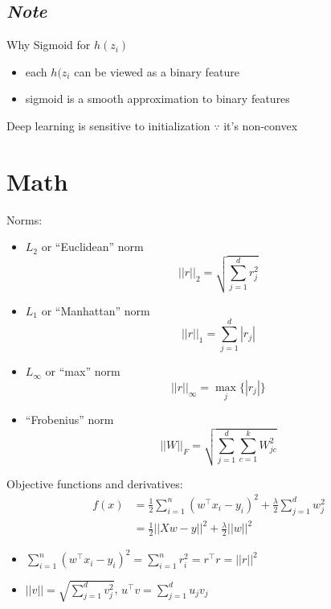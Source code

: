 \documentclass[10pt,landscape,a4paper]{article}
\begin{document}
\begin{multicols*}{5}
\subsection{\emph{Note}}
Why Sigmoid for \(h(z_i)\)
\begin{itemize}
    \item each \(h(z_i\) can be viewed as a binary feature
    \item sigmoid is a smooth approximation to binary features
\end{itemize}
Deep learning is sensitive to initialization \(\because\) it's non-convex

\section{Math}
Norms:
\begin{itemize}
    \item \(L_2\) or ``Euclidean'' norm
    \begin{equation*}
         ||r||_2 = \sqrt{\sum_{j=1}^{d} r_j^2}
    \end{equation*}
    \item \(L_1\) or ``Manhattan'' norm
    \begin{equation*}
        ||r||_1 = \sum_{j=1}^{d} |r_j|
    \end{equation*}
    \item \(L_{\infty}\) or ``max'' norm
    \begin{equation*}
        ||r||_{\infty} = \max_j{\{|r_j|}\}
    \end{equation*}
    \item ``Frobenius'' norm
    \begin{equation*}
        ||W||_F = \sqrt{\sum_{j=1}^{d} \sum_{c=1}^{k} W_{jc}^2}
    \end{equation*}
\end{itemize}
Objective functions and derivatives:
\begin{align*}
   f(x) &= \frac{1}{2}\sum\limits_{i=1}^{n} (w^\intercal x_i - y_i)^2 + \frac{\lambda}{2} \sum\limits_{j=1}^{d} w_j^2 \\
   &= \frac{1}{2} ||Xw-y||^2 + \frac{\lambda}{2} ||w||^2
\end{align*}
\begin{itemize}
    \item \(\sum\limits_{i=1}^{n} (w^\intercal x_i - y_i)^2 = \sum\limits_{i=1}^{n} r_i^2 = r^\intercal r = ||r||^2\)
    \item \(||v|| = \sqrt{\sum\limits_{j=1}^{d} v_j^2}\), \(u^\intercal v = \sum\limits_{j=1}^{d} u_j v_j\)

\end{itemize}
\end{multicols*}
\end{document}
